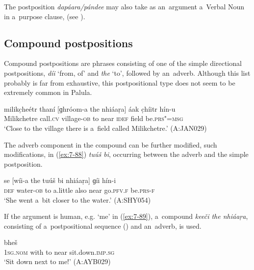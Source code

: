 The postposition \textit{dapáara/pándee} may also take as an~argument a~Verbal Noun in a~purpose clause, (see ).


\subsection{Compound postpositions}
\label{subsec:7-2-3}

Compound postpositions are phrases consisting of one of the simple directional postpositions, \textit{díi} `from, of' and \textit{the} `to', followed by an~adverb. Although this list probably is far from exhaustive, this postpositional type does not seem to be extremely common in Palula. 


\begin{exe}
\ex
\label{ex:7-87}
\gll milikc̣heétr thaní [ɡhróom-a the nhiáaṛa] áak c̣híitr hín-u \\
Milikchetre call.\textsc{cv} village-\textsc{ob} to near \textsc{idef} field be.\textsc{prs"=msg} \\
\glt `Close to the village there is a~field called Milikchetre.' (A:JAN029)
\end{exe}

The adverb component in the compound can be further modified, such modifications, in (\ref{ex:7-88}) \textit{tuúš bi}, occurring between the adverb and the simple postposition.

\begin{exe}
\ex
\label{ex:7-88}
\gll se [wíi-a the tuúš bi nhiáaṛa] ɡíi hín-i \\
\textsc{def} water-\textsc{ob} to a.little also near go.\textsc{pfv.f} be.\textsc{prs-f} \\
\glt `She went a~bit closer to the water.' (A:SHY054)
\end{exe}

If the argument is human, e.g. `me' in (\ref{ex:7-89}), a~compound \textit{keeči the nhiáaṛa}, consisting of a~postpositional sequence () and an~adverb, is used.

\begin{exe}
\ex
\label{ex:7-89}
 bheš \\
\textsc{1sg.nom} with to near sit.down.\textsc{imp.sg} \\
\glt `Sit down next to me!' (A:AYB029)
\end{exe}

